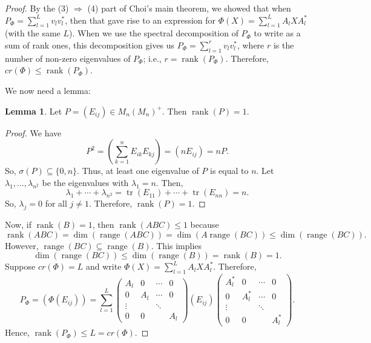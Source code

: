 \documentclass[12pt]{article}
\theoremstyle{definition}
\newtheorem*{lemma}{Lemma}
\DeclareMathOperator{\tr}{tr}
\begin{document}
\begin{proof}
By the (3) $\Rightarrow$ (4) part of Choi's main theorem, we showed that when $P_\Phi = \sum_{l=1}^L v_lv_l^*$, then that gave rise to an expression for $\Phi(X)=\sum_{l=1}^L A_lXA_l^*$ (with the same $L$). When we use the spectral decomposition of $P_\Phi$ to write as a sum of rank ones, this decomposition gives us $P_\Phi = \sum_{l=1}^r v_lv_l^*$, where $r$ is the number of non-zero eigenvalues of $P_\Phi$; i.e., $r=\operatorname{rank}(P_\Phi)$. Therefore, $cr(\Phi) \leq \operatorname{rank}(P_\Phi)$.

We now need a lemma:

\begin{lemma}
Let $P=(E_{ij}) \in M_n(M_n)^+$. Then $\operatorname{rank}(P)=1$.
\end{lemma}

\begin{proof}
We have
\[
P^2 = \left(\sum_{k=1}^n E_{ik}E_{kj}\right) = (nE_{ij}) = nP.
\]
So, $\sigma(P) \subseteq \{0,n\}$. Thus, at least one eigenvalue of $P$ is equal to $n$. Let $\lambda_1,\ldots,\lambda_{n^2}$ be the eigenvalues with $\lambda_1=n$. Then,
\[
\lambda_1 + \cdots + \lambda_{n^2} = \tr(E_{11}) + \cdots + \tr(E_{nn}) = n.
\]
So, $\lambda_j=0$ for all $j \neq 1$. Therefore, $\operatorname{rank}(P)=1$.
\end{proof}

Now, if $\operatorname{rank}(B)=1$, then $\operatorname{rank}(ABC) \leq 1$ because
\[
\operatorname{rank}(ABC)=\dim(\operatorname{range}(ABC)) = \dim(A\operatorname{range}(BC)) \leq \dim(\operatorname{range}(BC)).
\]
However, $\operatorname{range}(BC) \subseteq \operatorname{range}(B)$. This implies
\[
\dim(\operatorname{range}(BC)) \leq \dim(\operatorname{range}(B)) = \operatorname{rank}(B)=1.
\]
Suppose $cr(\Phi)=L$ and write $\Phi(X)=\sum_{l=1}^L A_lXA_l^*$. Therefore,
\[
P_\Phi = (\Phi(E_{ij})) = \sum_{l=1}^L \begin{pmatrix}A_l & 0 & \cdots & 0\\ 0 & A_l & \cdots & 0\\ \vdots & & \ddots & \\ 0 & 0 & & A_l\end{pmatrix}(E_{ij})\begin{pmatrix}A_l^* & 0 & \cdots & 0\\ 0 & A_l^* & \cdots & 0\\ \vdots & & \ddots & \\ 0 & 0 & & A_l^*\end{pmatrix}.
\]
Hence, $\operatorname{rank}(P_\Phi) \leq L = cr(\Phi)$.
\end{proof}
\end{document}
